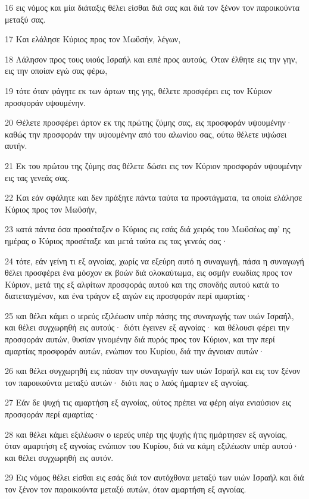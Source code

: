 \par 16 εις νόμος και μία διάταξις θέλει είσθαι διά σας και διά τον ξένον τον παροικούντα μεταξύ σας.
\par 17 Και ελάλησε Κύριος προς τον Μωϋσήν, λέγων,
\par 18 Λάλησον προς τους υιούς Ισραήλ και ειπέ προς αυτούς, Όταν έλθητε εις την γην, εις την οποίαν εγώ σας φέρω,
\par 19 τότε όταν φάγητε εκ των άρτων της γης, θέλετε προσφέρει εις τον Κύριον προσφοράν υψουμένην.
\par 20 Θέλετε προσφέρει άρτον εκ της πρώτης ζύμης σας, εις προσφοράν υψουμένην· καθώς την προσφοράν την υψουμένην από του αλωνίου σας, ούτω θέλετε υψώσει αυτήν.
\par 21 Εκ του πρώτου της ζύμης σας θέλετε δώσει εις τον Κύριον προσφοράν υψουμένην εις τας γενεάς σας.
\par 22 Και εάν σφάλητε και δεν πράξητε πάντα ταύτα τα προστάγματα, τα οποία ελάλησε Κύριος προς τον Μωϋσήν,
\par 23 κατά πάντα όσα προσέταξεν ο Κύριος εις εσάς διά χειρός του Μωϋσέως αφ' ης ημέρας ο Κύριος προσέταξε και μετά ταύτα εις τας γενεάς σας·
\par 24 τότε, εάν γείνη τι εξ αγνοίας, χωρίς να εξεύρη αυτό η συναγωγή, πάσα η συναγωγή θέλει προσφέρει ένα μόσχον εκ βοών διά ολοκαύτωμα, εις οσμήν ευωδίας προς τον Κύριον, μετά της εξ αλφίτων προσφοράς αυτού και της σπονδής αυτού κατά το διατεταγμένον, και ένα τράγον εξ αιγών εις προσφοράν περί αμαρτίας·
\par 25 και θέλει κάμει ο ιερεύς εξιλέωσιν υπέρ πάσης της συναγωγής των υιών Ισραήλ, και θέλει συγχωρηθή εις αυτούς· διότι έγεινεν εξ αγνοίας· και θέλουσι φέρει την προσφοράν αυτών, θυσίαν γινομένην διά πυρός προς τον Κύριον, και την περί αμαρτίας προσφοράν αυτών, ενώπιον του Κυρίου, διά την άγνοιαν αυτών·
\par 26 και θέλει συγχωρηθή εις πάσαν την συναγωγήν των υιών Ισραήλ και εις τον ξένον τον παροικούντα μεταξύ αυτών· διότι πας ο λαός ήμαρτεν εξ αγνοίας.
\par 27 Εάν δε ψυχή τις αμαρτήση εξ αγνοίας, ούτος πρέπει να φέρη αίγα ενιαύσιον εις προσφοράν περί αμαρτίας·
\par 28 και θέλει κάμει εξιλέωσιν ο ιερεύς υπέρ της ψυχής ήτις ημάρτησεν εξ αγνοίας, όταν αμαρτήση εξ αγνοίας ενώπιον του Κυρίου, διά να κάμη εξιλέωσιν υπέρ αυτού· και θέλει συγχωρηθή εις αυτόν.
\par 29 Εις νόμος θέλει είσθαι εις εσάς διά τον αυτόχθονα μεταξύ των υιών Ισραήλ και διά τον ξένον τον παροικούντα μεταξύ αυτών, όταν αμαρτήση εξ αγνοίας.
